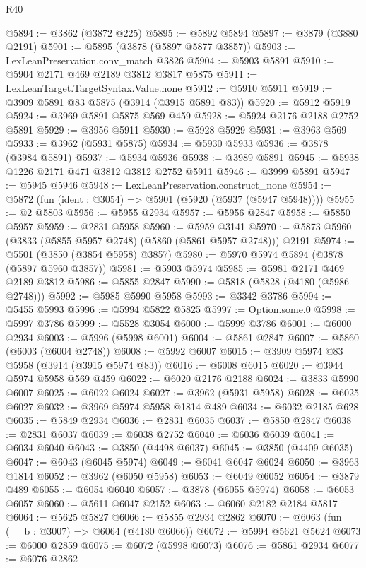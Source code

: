 \begin{lexlean}{R40}
\begin{coremodule}
@5894 := @3862 (@3872 @225)
@5895 := @5892 @5894
@5897 := @3879 (@3880 @2191)
@5901 := @5895 (@3878 (@5897 @5877 @3857))
@5903 := LexLeanPreservation.conv_match @3826
@5904 := @5903 @5891
@5910 := @5904 @2171 @469 @2189 @3812 @3817 @5875
@5911 := LexLeanTarget.TargetSyntax.Value.none
@5912 := @5910 @5911
@5919 := @3909 @5891 @83 @5875 (@3914 (@3915 @5891 @83))
@5920 := @5912 @5919
@5924 := @3969 @5891 @5875 @569 @459
@5928 := @5924 @2176 @2188 @2752 @5891
@5929 := @3956 @5911
@5930 := @5928 @5929
@5931 := @3963 @569
@5933 := @3962 (@5931 @5875)
@5934 := @5930 @5933
@5936 := @3878 (@3984 @5891)
@5937 := @5934 @5936
@5938 := @3989 @5891
@5945 := @5938 @1226 @2171 @471 @3812 @3812 @2752 @5911
@5946 := @3999 @5891
@5947 := @5945 @5946
@5948 := LexLeanPreservation.construct_none
@5954 := @5872 (fun (ident : @3054) => @5901 (@5920 (@5937 (@5947 @5948))))
@5955 := @2 @5803
@5956 := @5955 @2934
@5957 := @5956 @2847
@5958 := @5850 @5957
@5959 := @2831 @5958
@5960 := @5959 @3141
@5970 := @5873 @5960 (@3833 (@5855 @5957 @2748) (@5860 (@5861 @5957 @2748))) @2191
@5974 := @5501 (@3850 (@3854 @5958) @3857)
@5980 := @5970 @5974 @5894 (@3878 (@5897 @5960 @3857))
@5981 := @5903 @5974
@5985 := @5981 @2171 @469 @2189 @3812
@5986 := @5855 @2847
@5990 := @5818 (@5828 (@4180 (@5986 @2748)))
@5992 := @5985 @5990 @5958
@5993 := @3342 @3786
@5994 := @5455 @5993
@5996 := @5994 @5822 @5825
@5997 := Option.some.{0}
@5998 := @5997 @3786
@5999 := @5528 @3054
@6000 := @5999 @3786
@6001 := @6000 @2934
@6003 := @5996 (@5998 @6001)
@6004 := @5861 @2847
@6007 := @5860 (@6003 (@6004 @2748))
@6008 := @5992 @6007
@6015 := @3909 @5974 @83 @5958 (@3914 (@3915 @5974 @83))
@6016 := @6008 @6015
@6020 := @3944 @5974 @5958 @569 @459
@6022 := @6020 @2176 @2188
@6024 := @3833 @5990 @6007
@6025 := @6022 @6024
@6027 := @3962 (@5931 @5958)
@6028 := @6025 @6027
@6032 := @3969 @5974 @5958 @1814 @489
@6034 := @6032 @2185 @628
@6035 := @5849 @2934
@6036 := @2831 @6035
@6037 := @5850 @2847
@6038 := @2831 @6037
@6039 := @6038 @2752
@6040 := @6036 @6039
@6041 := @6034 @6040
@6043 := @3850 (@4498 @6037)
@6045 := @3850 (@4409 @6035)
@6047 := @6043 (@6045 @5974)
@6049 := @6041 @6047 @6024
@6050 := @3963 @1814
@6052 := @3962 (@6050 @5958)
@6053 := @6049 @6052
@6054 := @3879 @489
@6055 := @6054 @6040
@6057 := @3878 (@6055 @5974)
@6058 := @6053 @6057
@6060 := @5611 @6047 @2152
@6063 := @6060 @2182 @2184 @5817
@6064 := @5625 @5827
@6066 := @5855 @2934 @2862
@6070 := @6063 (fun (__b : @3007) => @6064 (@4180 @6066))
@6072 := @5994 @5621 @5624
@6073 := @6000 @2859
@6075 := @6072 (@5998 @6073)
@6076 := @5861 @2934
@6077 := @6076 @2862

\end{coremodule}
\end{lexlean}
